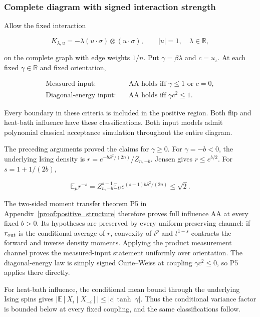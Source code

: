 \subsubsection{Complete diagram with signed interaction
strength}\label{quant:heading-7}

Allow the fixed interaction

\[
K_{\lambda,u}=-\lambda(u\cdot\sigma)\otimes(u\cdot\sigma),
\qquad |u|=1,\quad \lambda\in\mathbb R,
\]

on the complete graph with edge weights \(1/n\). Put
\(\gamma=\beta\lambda\) and \(c=u_z\). At each fixed
\(\gamma\in\mathbb R\) and fixed orientation,

\[
\boxed{\begin{aligned}
\text{Measured input:}\quad&
\text{AA holds iff }\gamma\le1\text{ or }c=0,\\
\text{Diagonal-energy input:}\quad&
\text{AA holds iff }\gamma c^2\le1.
\end{aligned}}
\]

Every boundary in these criteria is included in the positive region.
Both flip and heat-bath influence have these classifications. Both input
models admit polynomial classical acceptance simulation throughout the
entire diagram.

The preceding arguments proved the claims for \(\gamma\ge0\). For
\(\gamma=-b<0\), the underlying Ising density is
\(r=e^{-bS^2/(2n)}/Z_{n,-b}\). Jensen gives \(r\le e^{b/2}\). For
\(s=1+1/(2b)\),

\[
\mathbb E_{\mu}r^{-s}
=Z_{n,-b}^{s-1}\mathbb E_Ue^{(s-1)bS^2/(2n)}
\le\sqrt2.
\]

The two-sided moment transfer theorem P5 in
Appendix~\ref{proof:positive_structure} therefore
proves full influence AA at every fixed \(b>0\). Its hypotheses are
preserved by every uniform-preserving channel: if \(r_{\rm out}\) is the
conditional average of \(r\), convexity of \(t^p\) and \(t^{1-s}\)
contracts the forward and inverse density moments. Applying the product
measurement channel proves the measured-input statement uniformly over
orientation. The diagonal-energy law is simply signed Curie--Weiss at
coupling \(\gamma c^2\le0\), so P5 applies there directly.

For heat-bath influence, the conditional mean bound through the
underlying Ising spins gives
\(|\mathbb E[X_i\mid X_{-i}]|\le |c|\tanh|\gamma|\). Thus the
conditional variance factor is bounded below at every fixed coupling,
and the same classifications follow.
